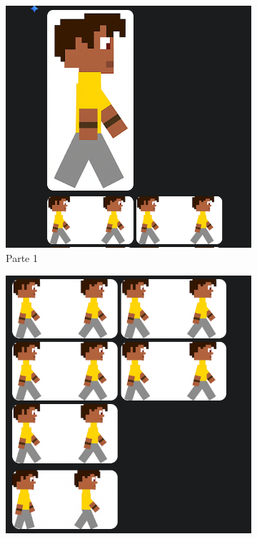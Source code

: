 \begin{figure}[htbp]
    \centering
    \caption{\small Resultado 1 da geração 5 do sprite sheet no Gemini Pro em julho/2025}
    \label{fig:geminiProSheet5_1}

    \begin{subfigure}{0.45\linewidth}
        \includegraphics[width=1\linewidth]{figs/geminiPro/chat10/tela1_res1_1.PNG}
        \caption{\small Parte 1}
        \label{fig:geminiProSheet5_1a}
    \end{subfigure}\hfill
    \begin{subfigure}{0.45\linewidth}
        \includegraphics[width=1\linewidth]{figs/geminiPro/chat10/tela1_res1_2.PNG}

\end{subfigure}
\end{figure}
